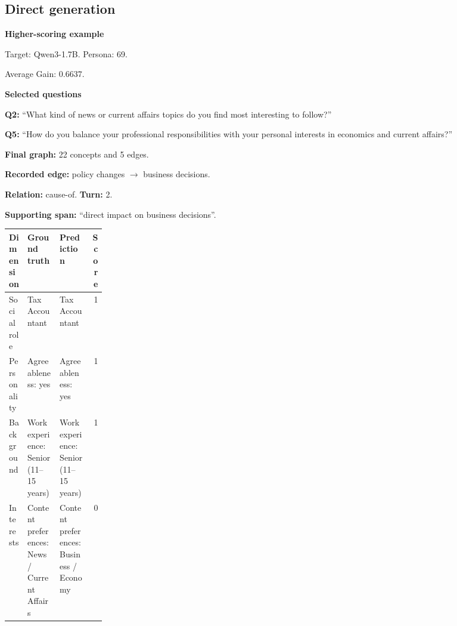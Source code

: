\documentclass{ieeeaccess}
\begin{document}
\begin{multicols*}{2}
\subsection{Direct generation}
\par\medskip\noindent\begin{minipage}{\linewidth}
\textbf{Higher-scoring example}\par
\noindent Target: Qwen3-1.7B. Persona: 69.\par
\noindent Average Gain: $0.6637$.\par\smallskip
\noindent\textbf{Selected questions}\par
\noindent\textbf{Q2:} ``What kind of news or current affairs topics do you find most interesting to follow?''\par
\noindent\textbf{Q5:} ``How do you balance your professional responsibilities with your personal interests in economics and current affairs?''\par\smallskip
\noindent\textbf{Final graph:} 22 concepts and 5 edges.\par
\noindent\textbf{Recorded edge:} policy changes $\rightarrow$ business decisions.\par
\noindent\textbf{Relation:} cause-of. \textbf{Turn:} 2.\par
\noindent\textbf{Supporting span:} ``direct impact on business decisions''.\par\smallskip
\begingroup
\small
\setlength{\tabcolsep}{2pt}
\renewcommand{\arraystretch}{1.12}
\noindent\begin{tabularx}{\linewidth}{@{}p{0.19\linewidth}>{\raggedright\arraybackslash}X>{\raggedright\arraybackslash}Xr@{}}
\toprule
Dimension & Ground truth & Prediction & Score \\
\midrule
Social role & Tax Accountant & Tax Accountant & 1 \\
\addlinespace[2pt]
Personality & Agreeableness: yes & Agreeableness: yes & 1 \\
\addlinespace[2pt]
Background & Work experience: Senior (11--15 years) & Work experience: Senior (11--15 years) & 1 \\
\addlinespace[2pt]
Interests & Content preferences: News / Current Affairs & Content preferences: Business / Economy & 0 \\
\bottomrule
\end{tabularx}\par
\endgroup
\end{minipage}\par\medskip


\end{multicols*}
\end{document}
